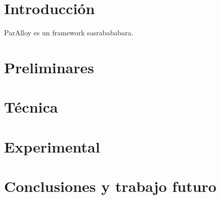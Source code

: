 \documentclass[a4paper, 11pt, twoside]{tesis}
\begin{document}
\def\autor{Ignacio Vissani}
\def\titulo{Acelerando ParAlloy mediante la reutilización de cláusulas
aprendidas} 
\def\runtitulo{Acelerando ParAlloy mediante la reutilización de cláusulas
aprendidas}
\def\runtitle{Acceleratin ParAlloy reusing learnt clauses}
\def\director{Carlos Gustavo López Pombo}
\def\lugar{Buenos Aires, 2012}


\frontmatter
\pagestyle{empty}


\cleardoublepage


\cleardoublepage

\cleardoublepage

\cleardoublepage
\tableofcontents

\mainmatter
\pagestyle{headings}

\chapter{Introducción}
ParAlloy \cite{rosner:abz10} es un framework sasrabababara.

\chapter{Preliminares}
\chapter{Técnica}
\chapter{Experimental}
\chapter{Conclusiones y trabajo futuro}

{}

\end{document}
